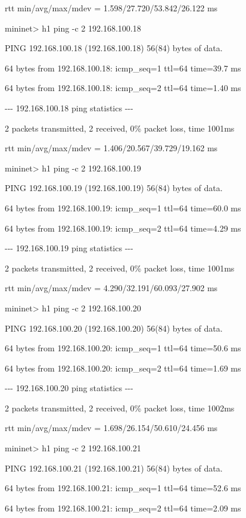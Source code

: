 rtt min/avg/max/mdev = 1.598/27.720/53.842/26.122 ms

mininet{\textgreater} h1 ping -c 2 192.168.100.18

PING 192.168.100.18 (192.168.100.18) 56(84) bytes of data.

64 bytes from 192.168.100.18: icmp\_seq=1 ttl=64 time=39.7 ms

64 bytes from 192.168.100.18: icmp\_seq=2 ttl=64 time=1.40 ms


\bigskip

{}-{}-{}- 192.168.100.18 ping statistics -{}-{}-

2 packets transmitted, 2 received, 0\% packet loss, time 1001ms

rtt min/avg/max/mdev = 1.406/20.567/39.729/19.162 ms

mininet{\textgreater} h1 ping -c 2 192.168.100.19

PING 192.168.100.19 (192.168.100.19) 56(84) bytes of data.

64 bytes from 192.168.100.19: icmp\_seq=1 ttl=64 time=60.0 ms

64 bytes from 192.168.100.19: icmp\_seq=2 ttl=64 time=4.29 ms


\bigskip

{}-{}-{}- 192.168.100.19 ping statistics -{}-{}-

2 packets transmitted, 2 received, 0\% packet loss, time 1001ms

rtt min/avg/max/mdev = 4.290/32.191/60.093/27.902 ms

mininet{\textgreater} h1 ping -c 2 192.168.100.20

PING 192.168.100.20 (192.168.100.20) 56(84) bytes of data.

64 bytes from 192.168.100.20: icmp\_seq=1 ttl=64 time=50.6 ms

64 bytes from 192.168.100.20: icmp\_seq=2 ttl=64 time=1.69 ms


\bigskip

{}-{}-{}- 192.168.100.20 ping statistics -{}-{}-

2 packets transmitted, 2 received, 0\% packet loss, time 1002ms

rtt min/avg/max/mdev = 1.698/26.154/50.610/24.456 ms

mininet{\textgreater} h1 ping -c 2 192.168.100.21

PING 192.168.100.21 (192.168.100.21) 56(84) bytes of data.

64 bytes from 192.168.100.21: icmp\_seq=1 ttl=64 time=52.6 ms

64 bytes from 192.168.100.21: icmp\_seq=2 ttl=64 time=2.09 ms


